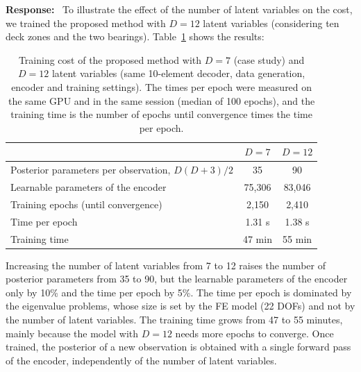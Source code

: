 \documentclass[11pt]{article}
\newenvironment{response}{\par\smallskip\noindent\color{resp}\textbf{Response:}\ }{\par}
\begin{document}
\begin{response}
To illustrate the effect of the number of latent variables on the cost, we trained the
proposed method with $D=12$ latent variables (considering ten deck zones and the two bearings). 
Table~\ref{tab:scal} shows the results:  
\begin{table}[H]
\centering\small
\caption{Training cost of the proposed method with $D=7$ (case study) and $D=12$ latent variables (same 10-element
decoder, data generation, encoder and training settings). The times per epoch were measured on the same GPU and in the same session (median of 100 epochs), and the training time is the number of epochs until convergence times the time per epoch.}
\label{tab:scal}
\begin{tabular}{lcc}
\toprule
 & $D=7$ & $D=12$ \\
\midrule
Posterior parameters per observation, $D(D+3)/2$ & 35 & 90 \\
Learnable parameters of the encoder & 75,306 & 83,046 \\
Training epochs (until convergence) & 2,150 & 2,410 \\
Time per epoch & 1.31 s & 1.38 s \\
Training time & 47 min & 55 min \\
\bottomrule
\end{tabular}
\end{table}

Increasing the number of latent variables from 7 to 12 raises the number of posterior parameters from 35 to 90, but the learnable parameters of the encoder only by 10\% and the time per epoch by 5\%.
The time per epoch is dominated by the eigenvalue problems, whose size is set by the FE model (22 DOFs) and not by the number of latent variables.
The training time grows from 47 to 55 minutes, mainly because the model with $D=12$ needs more epochs to converge. 
Once trained, the posterior of a new observation is obtained with a single forward pass of the encoder, independently of the number of latent variables.


\end{response}
\end{document}
